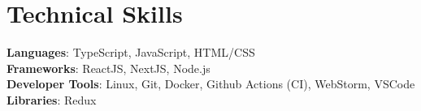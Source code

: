 \documentclass[letterpaper,11pt]{article}
\begin{document}
%
    \section{Technical Skills}
    \begin{itemize}[leftmargin=0.15in, label={}]
        \small{\item{
            \textbf{Languages}{: TypeScript, JavaScript, HTML/CSS } \\
            \textbf{Frameworks}{: ReactJS, NextJS, Node.js } \\
            \textbf{Developer Tools}{: Linux, Git, Docker, Github Actions (CI), WebStorm, VSCode } \\
            \textbf{Libraries}{: Redux }
        }}
    \end{itemize}


\end{document}
